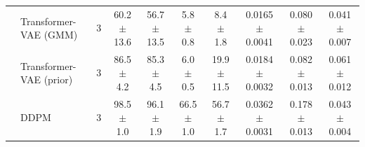 \begin{tabular}{llcccccccc}
 & Transformer-VAE (GMM) & 3 & 60.2 $\pm$ 13.6 & 56.7 $\pm$ 13.5 & 5.8 $\pm$ 0.8 & 8.4 $\pm$ 1.8 & 0.0165 $\pm$ 0.0041 & 0.080 $\pm$ 0.023 & 0.041 $\pm$ 0.007 \\
 & Transformer-VAE (prior) & 3 & 86.5 $\pm$ 4.2 & 85.3 $\pm$ 4.5 & 6.0 $\pm$ 0.5 & 19.9 $\pm$ 11.5 & 0.0184 $\pm$ 0.0032 & 0.082 $\pm$ 0.013 & 0.061 $\pm$ 0.012 \\
 & DDPM & 3 & 98.5 $\pm$ 1.0 & 96.1 $\pm$ 1.9 & 66.5 $\pm$ 1.0 & 56.7 $\pm$ 1.7 & 0.0362 $\pm$ 0.0031 & 0.178 $\pm$ 0.013 & 0.043 $\pm$ 0.004 \\
\hline
\end{tabular}